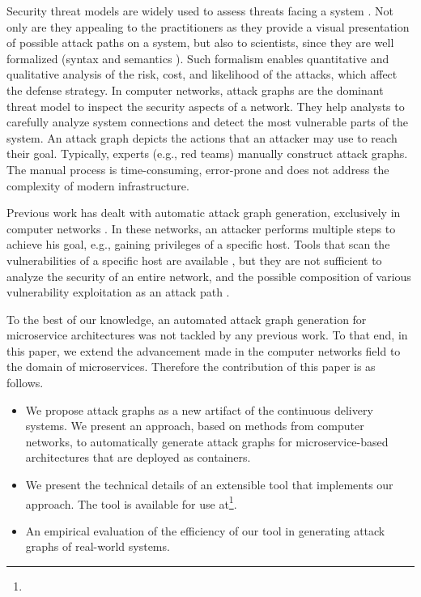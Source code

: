 Security threat models are widely used to assess threats facing a system \cite{kordy2014dag}. Not only are they appealing to the practitioners as they provide a visual presentation of possible attack paths on a system, but also to scientists, since they are well formalized (syntax and semantics \cite{mauw2005foundations,jha2002two}). Such formalism enables quantitative and qualitative analysis of the risk, cost, and likelihood of the attacks, which affect the defense strategy. In computer networks, attack graphs \cite{sheyner2002automated,ou2006scalable} are the dominant threat model to inspect the security aspects of a network. They help analysts to carefully analyze system connections and detect the most vulnerable parts of the system. An attack graph depicts the actions that an attacker may use to reach their goal. Typically, experts (e.g., red teams) manually construct attack graphs. The manual process is time-consuming, error-prone and does not address the complexity of modern infrastructure.  %


Previous work has dealt with automatic attack graph generation, exclusively in computer networks \cite{ingols2006practical, sheyner2002automated,  sheyner2003tools, ou2006scalable}. In these networks, an attacker performs multiple steps to achieve his goal, e.g., gaining privileges of a specific host. Tools that scan the vulnerabilities of a specific host are available \cite{farmer1990cops}, but they are not sufficient to analyze the security of an entire network, and the possible composition of various vulnerability exploitation as an attack path \cite{sheyner2002automated}. 

To the best of our knowledge, an automated attack graph generation for microservice architectures was not tackled by any previous work. To that end, in this paper, we extend the advancement made in the computer networks field to the domain of microservices. Therefore the contribution of this paper is as follows.
\begin{itemize}
	\item We propose attack graphs as a new artifact of the continuous delivery systems. We present an approach, based on methods from computer networks, to automatically generate attack graphs for microservice-based architectures that are deployed as containers.   
	\item We present the technical details of an extensible tool that implements our approach. The tool is available for use at\footnote{}.
	\item An empirical evaluation of the efficiency of our tool in generating attack graphs of real-world systems.
\end{itemize}



